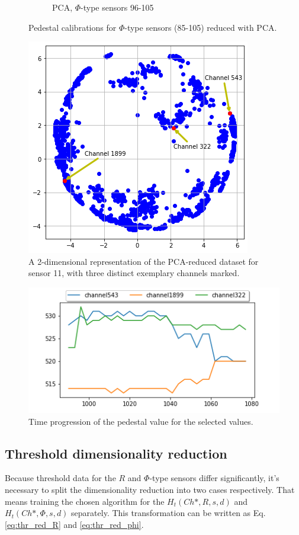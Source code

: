 \begin{figure}
\begin{subfigure}[b]{0.7\textwidth}
    \caption{PCA, $\Phi$-type sensors 96-105}
   \label{plot:PCA_pedestals_3_phi}
  \end{subfigure}

\caption[All calibrationd]{Pedestal calibrations for $\Phi$-type sensors (85-105) reduced with PCA.}
    \label{plot:pca_all_ped_phib}
\end{figure}




\begin{figure}[H]
    \centering
    \includegraphics[width=0.5\linewidth]{figures/chapter4/dimred/selected_channels_ped.png}
    \caption{A 2-dimensional representation of the PCA-reduced dataset for sensor 11, with three distinct exemplary channels marked.}
   \label{plot:PCA_selected}
  \end{figure}
  
  \begin{figure}[H]
    \centering
    \includegraphics[width=0.6\linewidth]{figures/chapter4/dimred/PCA_trends_channel.png}
    \caption{Time progression of the pedestal value for the selected values.}
   \label{plot:PCA_trend}
  \end{figure}

\subsection{Threshold dimensionality reduction}

Because threshold data for the $R$ and $\Phi$-type sensors differ significantly, it's necessary to split the dimensionality reduction into two cases respectively.
That means training the chosen algorithm for the $H_{t}(Ch*, R, s, d)$ and $H_t(Ch*, \Phi, s, d)$ separately.
This transformation can be written as Eq. \ref{eq:thr_red_R} and \ref{eq:thr_red_phi}.

